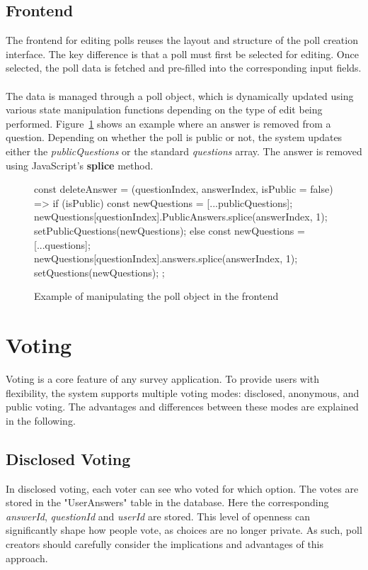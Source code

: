 \documentclass[a4paper,12pt]{report}
\begin{document}
\subsection{Frontend}
The frontend for editing polls reuses the layout and structure of the poll creation interface. The key difference is that a poll must first be selected for editing. Once selected, the poll data is fetched and pre-filled into the corresponding input fields. \\ \\
The data is managed through a poll object, which is dynamically updated using various state manipulation functions depending on the type of edit being performed. Figure~\ref{fig:editing} shows an example where an answer is removed from a question. Depending on whether the poll is public or not, the system updates either the \textit{publicQuestions} or the standard \textit{questions} array. The answer is removed using JavaScript’s \textbf{splice} method.

\begin{figure}[H]
	\begin{code}
		const deleteAnswer = (questionIndex, answerIndex, isPublic = false) => {
			if (isPublic) {
				const newQuestions = [...publicQuestions];
				newQuestions[questionIndex].PublicAnswers.splice(answerIndex, 1);
				setPublicQuestions(newQuestions);
			} else {
				const newQuestions = [...questions];
				newQuestions[questionIndex].answers.splice(answerIndex, 1);
				setQuestions(newQuestions);
			}
		};
	\end{code}
	\caption{Example of manipulating the poll object in the frontend}
	\label{fig:editing}
\end{figure}

\section{Voting}
Voting is a core feature of any survey application. To provide users with flexibility, the system supports multiple voting modes: disclosed, anonymous, and public voting. The advantages and differences between these modes are explained in the following. \\
\subsection{Disclosed Voting}
In disclosed voting, each voter can see who voted for which option. The votes are stored in the "UserAnswers" table in the database. Here the corresponding \textit{answerId}, \textit{questionId} and \textit{userId} are stored. This level of openness can significantly shape how people vote, as choices are no longer private. As such, poll creators should carefully consider the implications and advantages of this approach.
\end{document}
